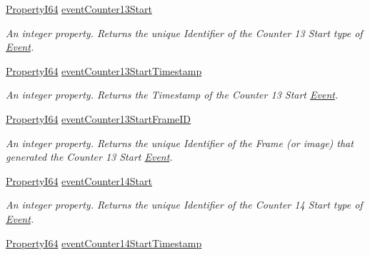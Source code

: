 \begin{DoxyCompactItemize}
\hyperlink{group___common_interface_ga81749b2696755513663492664a18a893}{Property\+I64} \hyperlink{classmv_i_m_p_a_c_t_1_1acquire_1_1_gen_i_cam_1_1_event_control_aad41e035b4e3f21a3fff09989666d8e6}{event\+Counter13\+Start}
\begin{DoxyCompactList}\small\item\em An integer property. Returns the unique Identifier of the Counter 13 Start type of \hyperlink{classmv_i_m_p_a_c_t_1_1acquire_1_1_event}{Event}. \end{DoxyCompactList}\item 
\hyperlink{group___common_interface_ga81749b2696755513663492664a18a893}{Property\+I64} \hyperlink{classmv_i_m_p_a_c_t_1_1acquire_1_1_gen_i_cam_1_1_event_control_ac7297d79dfc5760f171ec40516882677}{event\+Counter13\+Start\+Timestamp}
\begin{DoxyCompactList}\small\item\em An integer property. Returns the Timestamp of the Counter 13 Start \hyperlink{classmv_i_m_p_a_c_t_1_1acquire_1_1_event}{Event}. \end{DoxyCompactList}\item 
\hyperlink{group___common_interface_ga81749b2696755513663492664a18a893}{Property\+I64} \hyperlink{classmv_i_m_p_a_c_t_1_1acquire_1_1_gen_i_cam_1_1_event_control_a2f9484f2d79d11cf946b5f7e4977eaaf}{event\+Counter13\+Start\+Frame\+I\+D}
\begin{DoxyCompactList}\small\item\em An integer property. Returns the unique Identifier of the Frame (or image) that generated the Counter 13 Start \hyperlink{classmv_i_m_p_a_c_t_1_1acquire_1_1_event}{Event}. \end{DoxyCompactList}\item 
\hyperlink{group___common_interface_ga81749b2696755513663492664a18a893}{Property\+I64} \hyperlink{classmv_i_m_p_a_c_t_1_1acquire_1_1_gen_i_cam_1_1_event_control_a033db2c7349b1366ff97789dd8c64aff}{event\+Counter14\+Start}
\begin{DoxyCompactList}\small\item\em An integer property. Returns the unique Identifier of the Counter 14 Start type of \hyperlink{classmv_i_m_p_a_c_t_1_1acquire_1_1_event}{Event}. \end{DoxyCompactList}\item 
\hyperlink{group___common_interface_ga81749b2696755513663492664a18a893}{Property\+I64} \hyperlink{classmv_i_m_p_a_c_t_1_1acquire_1_1_gen_i_cam_1_1_event_control_aec1089ba430f085deb8d709305bdcdab}{event\+Counter14\+Start\+Timestamp}

\end{DoxyCompactItemize}
